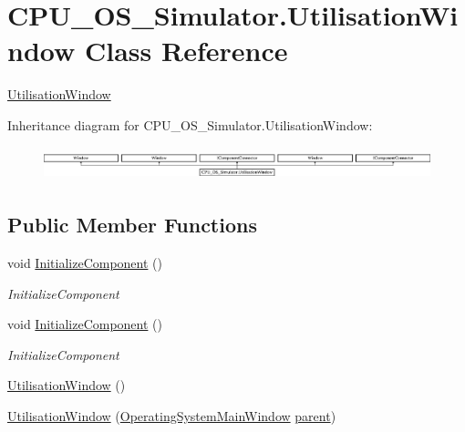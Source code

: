 \hypertarget{class_c_p_u___o_s___simulator_1_1_utilisation_window}{}\section{C\+P\+U\+\_\+\+O\+S\+\_\+\+Simulator.\+Utilisation\+Window Class Reference}
\label{class_c_p_u___o_s___simulator_1_1_utilisation_window}


\hyperlink{class_c_p_u___o_s___simulator_1_1_utilisation_window}{Utilisation\+Window}  


Inheritance diagram for C\+P\+U\+\_\+\+O\+S\+\_\+\+Simulator.\+Utilisation\+Window\+:\begin{figure}[H]
\begin{center}
\leavevmode
\includegraphics[height=0.973913cm]{class_c_p_u___o_s___simulator_1_1_utilisation_window}
\end{center}
\end{figure}
\subsection*{Public Member Functions}
\begin{DoxyCompactItemize}
\item 
void \hyperlink{class_c_p_u___o_s___simulator_1_1_utilisation_window_a59d8abfad27bc39958f00ca7cfb18b3e}{Initialize\+Component} ()
\begin{DoxyCompactList}\small\item\em Initialize\+Component \end{DoxyCompactList}\item 
void \hyperlink{class_c_p_u___o_s___simulator_1_1_utilisation_window_a59d8abfad27bc39958f00ca7cfb18b3e}{Initialize\+Component} ()
\begin{DoxyCompactList}\small\item\em Initialize\+Component \end{DoxyCompactList}\item 
\hyperlink{class_c_p_u___o_s___simulator_1_1_utilisation_window_a49cf31ea8bb70abda6aecdd4de8f4dfe}{Utilisation\+Window} ()
\item 
\hyperlink{class_c_p_u___o_s___simulator_1_1_utilisation_window_a015db78e8cb17406d2d630e129f09f3b}{Utilisation\+Window} (\hyperlink{class_c_p_u___o_s___simulator_1_1_operating_system_main_window}{Operating\+System\+Main\+Window} \hyperlink{class_c_p_u___o_s___simulator_1_1_utilisation_window_ab13e4df3318398d0e3c3565de5db4806}{parent})
\end{DoxyCompactItemize}
